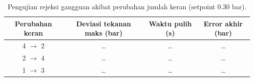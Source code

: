 \begin{table}[h]
  \centering
  \caption{Pengujian rejeksi gangguan akibat perubahan jumlah keran (setpoint 0.30 bar).}
  \label{tab:gangguan}
  \begin{tabular}{cccc}
    \hline
    \textbf{Perubahan keran} & \textbf{Deviasi tekanan maks (bar)} &
    \textbf{Waktu pulih (s)} & \textbf{Error akhir (bar)} \\
    \hline
    4 $\rightarrow$ 2 & \dots & \dots & \dots \\
    2 $\rightarrow$ 4 & \dots & \dots & \dots \\
    1 $\rightarrow$ 3 & \dots & \dots & \dots \\
    \hline
  \end{tabular}
\end{table}
